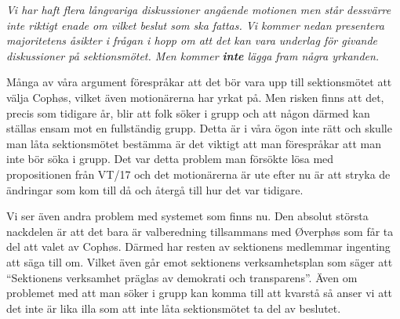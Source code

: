 \documentclass[../_main/handlingar.tex]{subfiles}
\begin{document}
\motionssvar
\textit{Vi har haft flera långvariga diskussioner angående motionen men står dessvärre inte riktigt enade om vilket beslut som ska fattas. Vi kommer nedan presentera majoritetens åsikter i frågan i hopp om att det kan vara underlag för givande diskussioner på sektionsmötet. Men kommer \textbf{inte} lägga fram några yrkanden.}

Många av våra argument förespråkar att det bör vara upp till sektionsmötet att välja Cophøs, vilket även motionärerna har yrkat på. Men risken finns att det, precis som tidigare år, blir att folk söker i grupp och att någon därmed kan ställas ensam mot en fullständig grupp. Detta är i våra ögon inte rätt och skulle man låta sektionsmötet bestämma är det viktigt att man förespråkar att man inte bör söka i grupp. Det var detta problem man försökte lösa med propositionen från VT/17 och det motionärerna är ute efter nu är att stryka de ändringar som kom till då och återgå till hur det var tidigare.

Vi ser även andra problem med systemet som finns nu. Den absolut största nackdelen är att det bara är valberedning tillsammans med Øverphøs som får ta del att valet av Cophøs. Därmed har resten av sektionens medlemmar ingenting att säga till om. Vilket även går emot sektionens verksamhetsplan som säger att “Sektionens verksamhet präglas av demokrati och transparens”. Även om problemet med att man söker i grupp kan komma till att kvarstå så anser vi att det inte är lika illa som att inte låta sektionsmötet ta del av beslutet.
\end{document}
